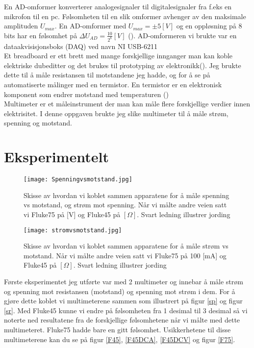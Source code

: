 \documentclass[norsk,a4paper,12pt]{article}
\begin{document}
En AD-omformer konverterer analogesignaler til digitalesignaler fra f.eks en mikrofon til en pc. Følsomheten til en slik omformer avhenger av den maksimale amplituden $U_{max}$. En AD-omformer med $U_{max} = \pm 5[V]$ og en oppløsning på 8 bits har en følsomhet på $\Delta U_{AD} = \frac{10}{2^8}[V]$ (\cite{grl}). AD-omformeren vi brukte var en dataakvisisjonsboks (DAQ) ved navn NI USB-6211 \\

Et breadboard er ett brett med mange forskjellige innganger man kan koble elektriske dubeditter og det brukes til prototyping av elektronikk(\cite{wiki}). Jeg brukte dette til å måle resistansen til motstandene jeg hadde, og for å se på automatiserte målinger med en termistor. En termistor er en elektronisk komponent som endrer motstand med temperaturen (\cite{wiki})\\

Multimeter er et måleinstrument der man kan måle flere forskjellige verdier innen elektrisitet. I denne oppgaven brukte jeg slike multimeter til å måle strøm, spenning og motstand. 

\section{Eksperimentelt}


\begin{figure}[h!]
	\begin{minipage}[b]{\linewidth}
	\centering
  	\texttt{[image: Spenningvsmotstand.jpg]}
  	\caption[Spenning vs motstand]{Skisse av hvordan vi koblet sammen apparatene for å måle spenning vs motstand, og strøm mot spenning. Når vi målte andre veien satt vi Fluke75 på [V] og Fluke45 på $[\Omega]$. Svart ledning illustrer jording}  	
	\label{sp}
	\hspace{0.5cm}
  	\end{minipage}
	\begin{minipage}[b]{\linewidth}
	\centering
  	\texttt{[image: stromvsmotstand.jpg]}
  	\caption[Strøm vs motstand]{Skisse av hvordan vi koblet sammen apparatene for å måle strøm 
	vs motstand. Når vi målte andre veien satt vi Fluke75 på 100 [mA] og Fluke45 på $[\Omega]$. 
	Svart ledning illustrer jording}
  	\label{sr}
  	\end{minipage}
 \end{figure}
 
Første eksperimentet jeg utførte var med 2 multimeter og innebar å måle strøm og spenning mot resistansen (motstand) og spenning mot strøm i dem. For å gjøre dette koblet vi multimeterene sammen som illustrert på figur \vref{sp} og figur \vref{sr}. Med Fluke45 kunne vi endre på følsomheten fra 1 desimal til 3 desimal så vi noterte ned resultatene fra de forskjellige følsomhetene når vi målte med dette multimeteret. Fluke75 hadde bare en gitt følsomhet. Usikkerhetene til disse multimeterene kan du se på figur \vref{F45}, \vref{F45DCA}, \vref{F45DCV} og figur \vref{F75}.\\
 
\end{document}
